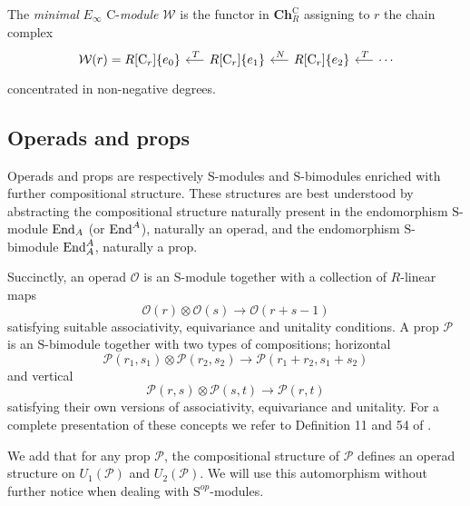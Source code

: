 \begin{definition} \label{def: minimal cyclic resolution}
	The \textit{minimal} $E_\infty$ $\mathrm{C}$-\textit{module} $\mathcal W$ is the functor in $\mathbf{Ch}_R^\mathrm{C}$ assigning to $r$ the chain complex
	\begin{equation*}
	\begin{tikzcd} [column sep = .5cm]
	\mathcal W(r) = R[\mathrm{C}_r]\{e_0\} & \arrow[l, "\,T"'] R[\mathrm{C}_r]\{e_1\} & \arrow[l, "\,N"'] R[\mathrm{C}_r]\{e_2\} & \arrow[l, "\,T"'] \cdots
	\end{tikzcd}
	\end{equation*}
	concentrated in non-negative degrees.
\end{definition}

\subsection{Operads and props}

Operads and props are respectively $\mathrm{S}$-modules and $\mathrm{S}$-bimodules enriched with further compositional structure.
These structures are best understood by abstracting the compositional structure naturally present in the endomorphism $\mathrm{S}$-module $\mathrm{End}_A$ (or $\mathrm{End}^A$), naturally an operad, and the endomorphism $\mathrm{S}$-bimodule $\mathrm{End}_A^A$, naturally a prop.

Succinctly, an operad $\mathcal O$ is an $\mathrm{S}$-module together with a collection of $R$-linear maps
\begin{equation*}
\mathcal O(r) \otimes \mathcal O(s) \to \mathcal O(r+s-1)
\end{equation*}
satisfying suitable associativity, equivariance and unitality conditions.
A prop $\mathcal P$ is an $\mathrm{S}$-bimodule together with two types of compositions; horizontal
\begin{equation*}
\mathcal P(r_1, s_1) \otimes \mathcal P(r_2, s_2) \to \mathcal P(r_1 + r_2, s_1 + s_2)
\end{equation*}
and vertical
\begin{equation*}
\mathcal P(r,s) \otimes \mathcal P(s, t) \to \mathcal P(r, t)
\end{equation*}
satisfying their own versions of associativity, equivariance and unitality.
For a complete presentation of these concepts we refer to Definition 11 and 54 of \cite{markl2008props}.

We add that for any prop $\mathcal P$, the compositional structure of $\mathcal P$ defines an operad structure on $U_1(\mathcal P)$ and $U_2(\mathcal P)$.
We will use this automorphism without further notice when dealing with $\mathrm{S}^{op}$-modules.

